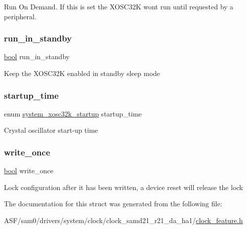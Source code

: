 Run On Demand. If this is set the X\+O\+S\+C32K won\textquotesingle{}t run until requested by a peripheral. \mbox{\label{structsystem__clock__source__xosc32k__config_a514964d5c2a8da4dd96bac82a53477f2}} 
\subsubsection{\texorpdfstring{run\_in\_standby}{run\_in\_standby}}
{\footnotesize\ttfamily \mbox{\hyperlink{group__group__sam0__utils_ga97a80ca1602ebf2303258971a2c938e2}{bool}} run\+\_\+in\+\_\+standby}

Keep the X\+O\+S\+C32K enabled in standby sleep mode \mbox{\label{structsystem__clock__source__xosc32k__config_a57be16a01eb8dea465b7e1c94ba9ecd8}} 
\subsubsection{\texorpdfstring{startup\_time}{startup\_time}}
{\footnotesize\ttfamily enum \mbox{\hyperlink{group__asfdoc__sam0__system__clock__group_ga6a5226fe65f283da094a3d1bd6c5692f}{system\+\_\+xosc32k\+\_\+startup}} startup\+\_\+time}

Crystal oscillator start-\/up time \mbox{\label{structsystem__clock__source__xosc32k__config_a9caf694235ca3f471e8167a317b6f581}} 
\subsubsection{\texorpdfstring{write\_once}{write\_once}}
{\footnotesize\ttfamily \mbox{\hyperlink{group__group__sam0__utils_ga97a80ca1602ebf2303258971a2c938e2}{bool}} write\+\_\+once}

Lock configuration after it has been written, a device reset will release the lock 

The documentation for this struct was generated from the following file\+:\begin{DoxyCompactItemize}
\item 
A\+S\+F/sam0/drivers/system/clock/clock\+\_\+samd21\+\_\+r21\+\_\+da\+\_\+ha1/\mbox{\hyperlink{clock__feature_8h}{clock\+\_\+feature.\+h}}\end{DoxyCompactItemize}
